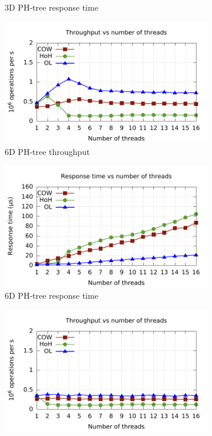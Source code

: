 \documentclass[11pt,a4paper]{globis-book}
\begin{document}
\begin{figure}
\begin{subfigure}[b]{0.5\linewidth}
        \caption{3D PH-tree response time}
    \end{subfigure}
    \centering
    \begin{subfigure}[b]{0.5\linewidth}
        \includegraphics[scale=0.5]{images/plots/insert6d-tp}
        \caption{6D PH-tree throughput}
    \end{subfigure}%
    \begin{subfigure}[b]{0.5\linewidth}
        \includegraphics[scale=0.5]{images/plots/insert6d-rt}
        \caption{6D PH-tree response time}
    \end{subfigure}
    \begin{subfigure}[b]{0.5\linewidth}
        \includegraphics[scale=0.5]{images/plots/insert10d-tp}

\end{subfigure}
\end{figure}
\end{document}
